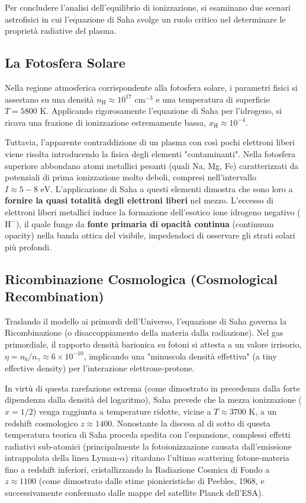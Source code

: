 Per concludere l'analisi dell'equilibrio di ionizzazione, si esaminano due scenari astrofisici in cui l'equazione di Saha svolge un ruolo critico nel determinare le proprietà radiative del plasma.

\subsection{La Fotosfera Solare}
Nella regione atmosferica corrispondente alla fotosfera solare, i parametri fisici si assestano su una densità $n_{\text{H}} \approx 10^{17} \text{ cm}^{-3}$ e una temperatura di superficie $T = 5800 \text{ K}$. Applicando rigorosamente l'equazione di Saha per l'idrogeno, si ricava una frazione di ionizzazione estremamente bassa, $x_{\text{H}} \approx 10^{-4}$.

Tuttavia, l'apparente contraddizione di un plasma con così pochi elettroni liberi viene risolta introducendo la fisica degli elementi "contaminanti". Nella fotosfera superiore abbondano atomi metallici pesanti (quali Na, Mg, Fe) caratterizzati da potenziali di prima ionizzazione molto deboli, compresi nell'intervallo $I \approx 5-8 \text{ eV}$. L'applicazione di Saha a questi elementi dimostra che sono loro a \textbf{fornire la quasi totalità degli elettroni liberi} nel mezzo.
L'eccesso di elettroni liberi metallici induce la formazione dell'esotico ione idrogeno negativo ($\text{H}^-$), il quale funge da \textbf{fonte primaria di opacità continua} (continuum opacity) nella banda ottica del visibile, impedendoci di osservare gli strati solari più profondi.

\subsection{Ricombinazione Cosmologica (Cosmological Recombination)}
Traslando il modello ai primordi dell'Universo, l'equazione di Saha governa la Ricombinazione (o disaccoppiamento della materia dalla radiazione).
Nel gas primordiale, il rapporto densità barionica su fotoni si attesta a un valore irrisorio, $\eta = n_b / n_\gamma \approx 6 \times 10^{-10}$, implicando una "minuscola densità effettiva" (a tiny effective density) per l'interazione elettrone-protone.

In virtù di questa rarefazione estrema (come dimostrato in precedenza dalla forte dipendenza dalla densità del logaritmo), Saha prevede che la mezza ionizzazione ($x=1/2$) venga raggiunta a temperature ridotte, vicine a $T \approx 3700 \text{ K}$, a un redshift cosmologico $z \approx 1400$. Nonostante la discesa al di sotto di questa temperatura teorica di Saha proceda spedita con l'espansione, complessi effetti radiativi sub-atomici (principalmente la fotoionizzazione causata dall'emissione intrappolata della linea Lyman-$\alpha$) ritardano l'ultimo scattering fotone-materia fino a redshift inferiori, cristallizzando la Radiazione Cosmica di Fondo a $z \approx 1100$ (come dimostrato dalle stime pionieristiche di Peebles, 1968, e successivamente confermato dalle mappe del satellite Planck dell'ESA).

